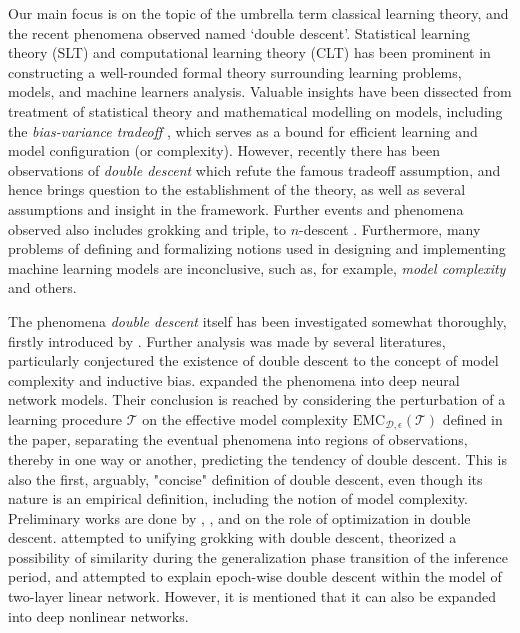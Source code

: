 \documentclass{article}
\begin{document}
Our main focus is on the topic of the umbrella term classical learning theory, and the recent phenomena observed named `double descent'. Statistical learning theory (SLT) and computational learning theory (CLT) \cite{Vapnik1999-VAPTNO,10.5555/2371238,10.5555/2621980,STL_Hajek_Maxim_2021,bousquet2020theoryuniversallearning} has been prominent in constructing a well-rounded formal theory surrounding learning problems, models, and machine learners analysis. Valuable insights have been dissected from treatment of statistical theory and mathematical modelling on models, including the \textit{bias-variance tradeoff} \cite{6797087,Domingos2000AUB}, which serves as a bound for efficient learning and model configuration (or complexity). However, recently there has been observations of \textit{double descent} \cite{belkin_reconciling_2019,schaeffer_double_2023,nakkiran_deep_2019,lafon_understanding_2024} which refute the famous tradeoff assumption, and hence brings question to the establishment of the theory, as well as several assumptions and insight in the framework. Further events and phenomena observed also includes grokking and triple, to $n$-descent \cite{davies_unifying_2023,d_ascoli_triple_2020}. Furthermore, many problems of defining and formalizing notions used in designing and implementing machine learning models are inconclusive, such as, for example, \textit{model complexity} and others. 

The phenomena \textit{double descent} itself has been investigated somewhat thoroughly, firstly introduced by \cite{belkin_reconciling_2019}. Further analysis was made by several literatures, particularly conjectured the existence of double descent to the concept of model complexity and inductive bias. \cite{nakkiran_deep_2019} expanded the phenomena into deep neural network models. Their conclusion is reached by considering the perturbation of a learning procedure $\mathcal{T}$ on the effective model complexity $\mathrm{EMC}_{\mathcal{D},\epsilon}(\mathcal{T})$ defined in the paper, separating the eventual phenomena into regions of observations, thereby in one way or another, predicting the tendency of double descent. This is also the first, arguably, "concise" definition of double descent, even though its nature is an empirical definition, including the notion of model complexity. Preliminary works are done by \cite{lafon_understanding_2024}, \cite{schaeffer_double_2023}, and \cite{liu2023understandingroleoptimizationdouble} on the role of optimization in double descent. \cite{davies_unifying_2023} attempted to unifying grokking with double descent, theorized a possibility of similarity during the generalization phase transition of the inference period, and \cite{olmin2024understandingepochwisedoubledescent} attempted to explain epoch-wise double descent within the model of two-layer linear network. However, it is mentioned that it can also be expanded into deep nonlinear networks. 
\end{document}
